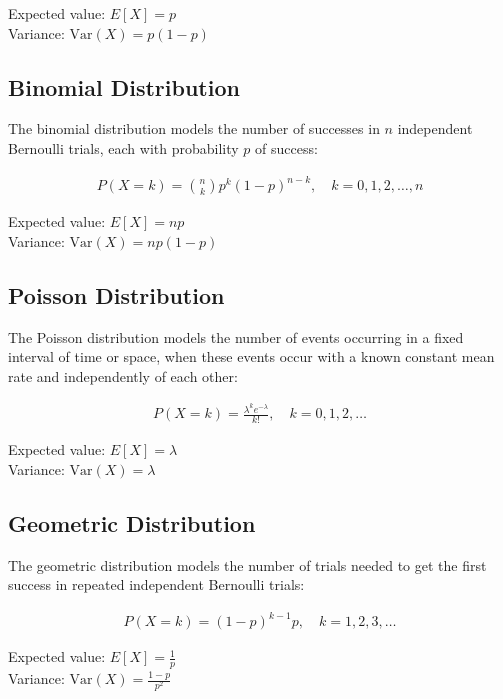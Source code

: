 \documentclass[12pt,a4paper]{article}
\begin{document}
Expected value: $E[X] = p$\\
Variance: $\text{Var}(X) = p(1-p)$

\subsection{Binomial Distribution}
The binomial distribution models the number of successes in $n$ independent Bernoulli trials, each with probability $p$ of success:

\begin{align}
P(X = k) = \binom{n}{k} p^k (1-p)^{n-k}, \quad k = 0, 1, 2, \ldots, n
\end{align}

Expected value: $E[X] = np$\\
Variance: $\text{Var}(X) = np(1-p)$

\subsection{Poisson Distribution}
The Poisson distribution models the number of events occurring in a fixed interval of time or space, when these events occur with a known constant mean rate and independently of each other:

\begin{align}
P(X = k) = \frac{\lambda^k e^{-\lambda}}{k!}, \quad k = 0, 1, 2, \ldots
\end{align}

Expected value: $E[X] = \lambda$\\
Variance: $\text{Var}(X) = \lambda$

\subsection{Geometric Distribution}
The geometric distribution models the number of trials needed to get the first success in repeated independent Bernoulli trials:

\begin{align}
P(X = k) = (1-p)^{k-1} p, \quad k = 1, 2, 3, \ldots
\end{align}

Expected value: $E[X] = \frac{1}{p}$\\
Variance: $\text{Var}(X) = \frac{1-p}{p^2}$
\end{document}

